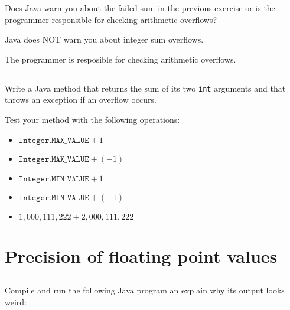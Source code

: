 \documentclass[a4paper, 11pt]{article}
\begin{document}
Does Java warn you about the failed sum in the previous exercise
or is the programmer responsible for checking arithmetic overflows?

\begin{solution}
Java does NOT warn you about integer sum overflows.

The programmer is resposible for checking arithmetic overflows.
\end{solution}

\subsection{}

Write a Java method that returns the sum of its two \texttt{int} arguments
and that throws an exception if an overflow occurs.

Test your method with the following operations:

\begin{itemize}
  \item $\texttt{Integer.MAX\_VALUE} + 1$
  \item $\texttt{Integer.MAX\_VALUE} + (-1)$
  \item $\texttt{Integer.MIN\_VALUE} + 1$
  \item $\texttt{Integer.MIN\_VALUE} + (-1)$
  \item $1,000,111,222 + 2,000,111,222$
\end{itemize}


\section{Precision of floating point values}

\subsection{}

Compile and run the following Java program an explain why its output looks
weird:
\end{document}
